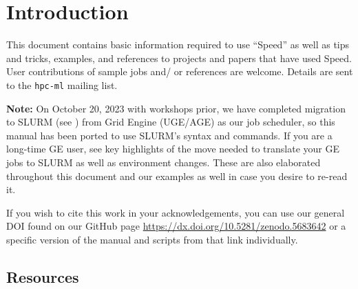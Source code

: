 \documentclass{easychair}
\begin{document}
\tableofcontents
\clearpage

\section{Introduction}

This document contains basic information required to use ``Speed'' as well as 
tips and tricks, examples, and references to projects and papers that have used Speed. 
User contributions of sample jobs and/ or references are welcome. 
Details are sent to the \texttt{hpc-ml} mailing list.

\textbf{Note:} On October 20, 2023 with workshops prior, we have completed migration to SLURM (see )
from Grid Engine (UGE/AGE) as our job scheduler, so this manual has been ported to use SLURM's
syntax and commands. If you are a long-time GE user, see  key highlights
of the move needed to translate your GE jobs to SLURM as well as environment changes.
These are also elaborated throughout this document and our examples as well in case you
desire to re-read it.

If you wish to cite this work in your acknowledgements, you can use 
our general DOI found on our GitHub page
\url{https://dx.doi.org/10.5281/zenodo.5683642} or a specific
version of the manual and scripts from that link individually.

\subsection{Resources}
\end{document}
